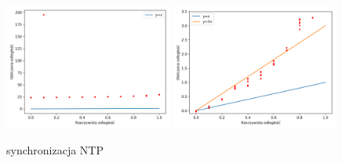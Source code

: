 \begin{frame}
    \begin{figure}
        \centering
        \includegraphics[width=0.49\textwidth]{../pics/ntp_sync_dist/dists.png}
        \includegraphics[width=0.49\textwidth]{../pics/ntp_sync_dist/dists_close.png}
        \caption{synchronizacja NTP}
    \end{figure}
\end{frame}